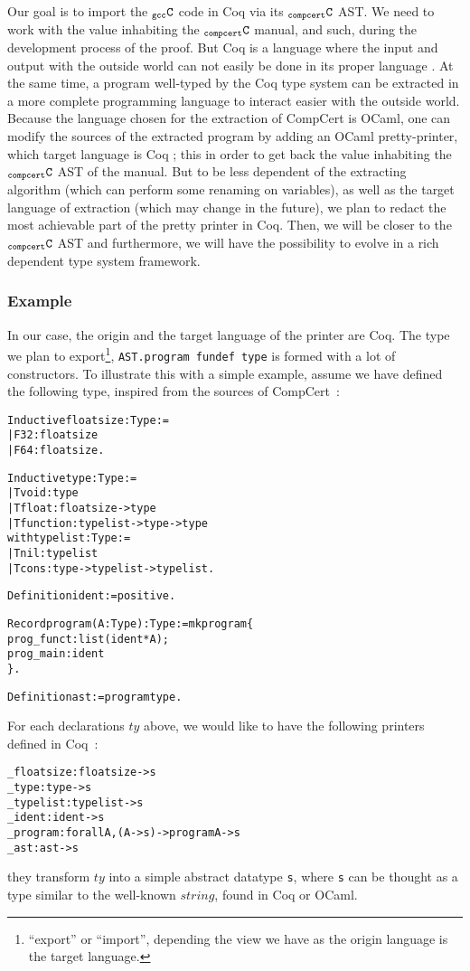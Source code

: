 \documentclass[a4paper, 11pt]{article}
\newenvironment{coq}
  {%
   \begin{alltt}
   \footnotesize} %% 8.3pl2 (April 2011)
  {\end{alltt} %
  }
\newcommand{\ccert}{CompCert\xspace}
\newcommand{\C}{$_{\tt compcert}{\tt C}$\xspace}
\newcommand{\gccC}{$_{\tt gcc}{\tt C}$\xspace}
\newcommand{\outworld}{the outside world\xspace}
\begin{document}
Our goal is to import the \gccC code in Coq via its \C AST. We need to work with the value inhabiting the \C manual, and such, during the development process of the proof. But Coq is a language where the input and output with \outworld can not easily be done in its proper language%
. At the same time, a program well-typed by the Coq type system can be extracted in a more complete programming language to interact easier with \outworld. Because the language chosen for the extraction of \ccert is OCaml, one can modify the sources of the extracted program by adding an OCaml pretty-printer, which target language is Coq ; this in order to get back the value inhabiting the \C AST of the manual. But to be less dependent of the extracting algorithm (which can perform some renaming on variables), as well as the target language of extraction (which may change in the future), we plan to redact the most achievable part of the pretty printer in Coq. Then, we will be closer to the \C AST and furthermore, we will have the possibility to evolve in a rich dependent type system framework. 
\subsubsection{Example}
In our case, the origin and the target language of the printer are Coq. The type we plan to export\footnote{``export'' or ``import'', depending the view we have as the origin language is the target language.}, \verb|AST.program fundef type| is formed with a lot of constructors. To illustrate this with a simple example, assume we have defined the following type, inspired from the sources of \ccert~:
\begin{coq}
Inductive floatsize : Type :=
  | F32: floatsize
  | F64: floatsize.

Inductive type : Type :=
  | Tvoid : type
  | Tfloat: floatsize -> type
  | Tfunction: typelist -> type -> type
with typelist : Type :=
  | Tnil : typelist
  | Tcons : type -> typelist -> typelist.

Definition ident := positive.

Record program (A : Type) : Type := mkprogram \{
  prog_funct : list (ident * A);
  prog_main : ident
\}.

Definition ast := program type.
\end{coq}
For each declarations $ty$ above, we would like to have the following printers defined in Coq~:
\begin{coq}
_floatsize : floatsize -> s
_type : type -> s
_typelist : typelist -> s
_ident : ident -> s
_program : forall A, (A -> s) -> program A -> s
_ast : ast -> s
\end{coq}
they transform $ty$ into a simple abstract datatype \verb|s|, where \verb|s| can be thought as a type similar to the well-known $string$, found in Coq or OCaml.
\end{document}
